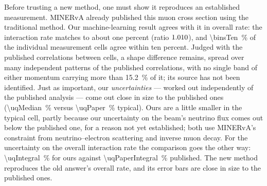 Before trusting a new method, one must show it reproduces an established measurement. MINERvA already published this muon cross section using the traditional method. Our machine-learning result agrees with it in overall rate: the interaction rate matches to about one percent (ratio $1.010$), and \SI{\binsTen}{\percent} of the individual measurement cells agree within ten percent. Judged with the published correlations between cells, a shape difference remains, spread over many independent patterns of the published correlations, with no single band of either momentum carrying more than \SI{15.2}{\percent} of it; its source has not been identified. Just as important, our \emph{uncertainties} --- worked out independently of the published analysis --- come out close in size to the published ones (\SI{\uqMedian}{\percent} versus \SI{\uqPaper}{\percent} typical). Ours are a little smaller in the typical cell, partly because our uncertainty on the beam's neutrino flux comes out below the published one, for a reason not yet established; both use MINERvA's constraint from neutrino--electron scattering and inverse muon decay. For the uncertainty on the overall interaction rate the comparison goes the other way: \SI{\uqIntegral}{\percent} for ours against \SI{\uqPaperIntegral}{\percent} published. The new method reproduces the old answer's overall rate, and its error bars are close in size to the published ones.

